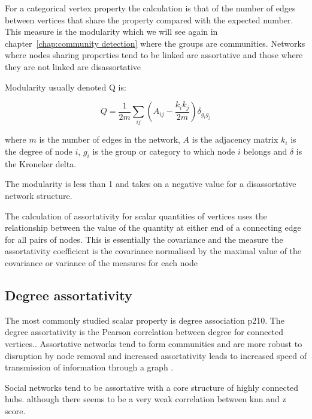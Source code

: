 For a categorical vertex property the calculation is that of the number of edges between vertices that share the property compared with the expected number. This measure is the modularity which we will see again in chapter~\ref{chap:community detection} where the groups are communities. Networks where nodes sharing properties tend to be linked are assortative and those where they are not linked are disassortative

Modularity usually denoted Q is:

\begin{equation}
    Q = \frac{1}{2m}\sum_{ij}(A_{ij}-\frac{k_ik_j}{2m})\delta_{g_ig_j}
\end{equation}

where $m$ is the number of edges in the network, $A$ is the adjacency matrix $k_i$ is the degree of node $i$, $g_i$ is the group or category to which node $i$ belongs and $\delta$ is the Kroneker delta. 

The modularity is less than 1 and takes on a negative value for a disassortative network structure.

The calculation of assortativity for scalar quantities of vertices uses the relationship between the value of the quantity at either end of a connecting edge for all pairs of nodes. This is essentially the covariance and the measure the assortativity coefficient is the covariance normalised by the maximal value of the covariance or variance of the measures for each node 

\subsection{Degree assortativity}
\label{sec:degree assortativity}

The most commonly studied scalar property is degree association \cite{newman2018networks}p210. The degree assortativity is the Pearson correlation between degree for connected vertices.\cite{noldus2015assortativity}. Assortative networks tend to form communities and are more robust to disruption by node removal  \cite{newman2002assortative} and increased assortativity leads to increased speed of transmission of information through a graph \cite{noldus2015assortativity}.

Social networks tend to be assortative with a core structure of highly connected hubs. \cite{newman2018networks}
 although there seems to be a very weak correlation between knn and z score. 



